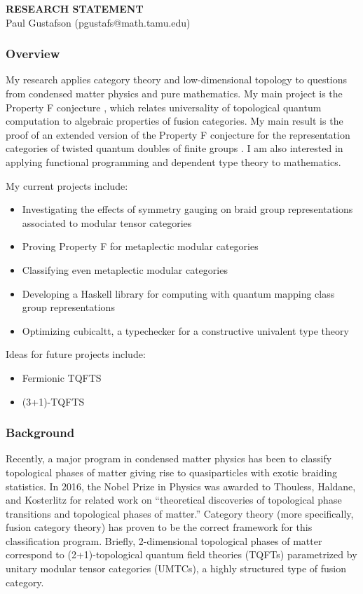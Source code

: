 \documentclass[12pt]{article}
\theoremstyle{plain} \numberwithin{equation}{section}
\theoremstyle{definition}
\begin{document}
\begin{center}
{\bf RESEARCH STATEMENT}\\
\vspace*{0.1cm}
{\normalsize Paul Gustafson (pgustafs@math.tamu.edu)}
\end{center}




\subsubsection*{Overview}

My research applies category theory and low-dimensional topology to questions from condensed matter physics and pure mathematics.   My main project is the Property F conjecture \cite{nr}, which relates universality of topological quantum computation to algebraic properties of fusion categories.  My main result is the proof of  an extended version of the Property F conjecture for the representation categories of twisted quantum doubles of finite groups \cite{g}. I am also interested in applying functional programming and dependent type theory to mathematics.  

My current projects include:
\begin{itemize}
\item Investigating the effects of symmetry gauging on braid group representations associated to modular tensor categories
\item Proving Property F for metaplectic modular categories
\item Classifying even metaplectic modular categories
\item Developing a Haskell library for computing with quantum mapping class group representations
\item Optimizing cubicaltt, a typechecker for a constructive univalent type theory
\end{itemize}

Ideas for future projects include:
\begin{itemize}
  \item Fermionic TQFTS
  \item (3+1)-TQFTS
\end{itemize}


\subsubsection*{Background}

Recently, a major program in condensed matter physics has been to classify topological phases of matter giving rise to quasiparticles with exotic braiding statistics. In 2016, the Nobel Prize in Physics was awarded to Thouless, Haldane, and Kosterlitz for related work on ``theoretical discoveries of topological phase transitions and topological phases of matter.'' Category theory (more specifically, fusion category theory) has proven to be the correct framework for this classification program. Briefly, 2-dimensional topological phases of matter correspond to (2+1)-topological quantum field theories (TQFTs) parametrized by unitary modular tensor categories (UMTCs), a highly structured type of fusion category. 
\end{document}
